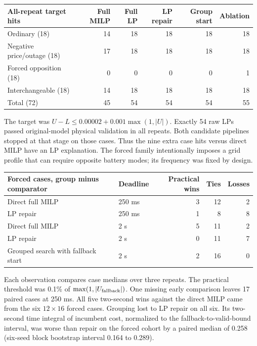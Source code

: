 \documentclass[10pt,letterpaper]{article}
\begin{document}
\begin{center}\small
\begin{tabular}{@{}lrrrrr@{}}
\toprule
All-repeat target hits & Full MILP & Full LP & LP repair & Group start & Ablation\\\midrule
Ordinary (18) &14&18&18&18&18\\
Negative price/outage (18)&17&18&18&18&18\\
Forced opposition (18)&0&0&0&0&1\\
Interchangeable (18)&14&18&18&18&18\\\midrule
Total (72)&45&54&54&54&55\\\bottomrule
\end{tabular}
\end{center}

The target was $U-L\le 0.00002+0.001\max(1,|U|)$. Exactly 54 raw LPs passed original-model physical validation in all repeats. Both candidate pipelines stopped at that stage on those cases. Thus the nine extra case hits versus direct MILP have an LP explanation. The forced family intentionally imposes a grid profile that can require opposite battery modes; its frequency was fixed by design.

\begin{center}\small
\begin{tabular}{@{}llrrr@{}}
\toprule
Forced cases, group minus comparator & Deadline & Practical wins & Ties & Losses\\\midrule
Direct full MILP & 250 ms & 3 & 12 & 2\\
LP repair & 250 ms & 1 & 8 & 8\\
Direct full MILP & 2 s & 5 & 11 & 2\\
LP repair & 2 s & 0 & 11 & 7\\
Grouped search with fallback start & 2 s & 2 & 16 & 0\\\bottomrule
\end{tabular}
\end{center}
Each observation compares case medians over three repeats. The practical threshold was 0.1\% of $\max(1,|U_{\rm fallback}|)$. One missing early comparison leaves 17 paired cases at 250 ms. All five two-second wins against the direct MILP came from the six $12\times16$ forced cases. Grouping lost to LP repair on all six. Its two-second time integral of incumbent cost, normalized to the fallback-to-valid-bound interval, was worse than repair on the forced cohort by a paired median of 0.258 (six-seed block bootstrap interval 0.164 to 0.289).
\end{document}
